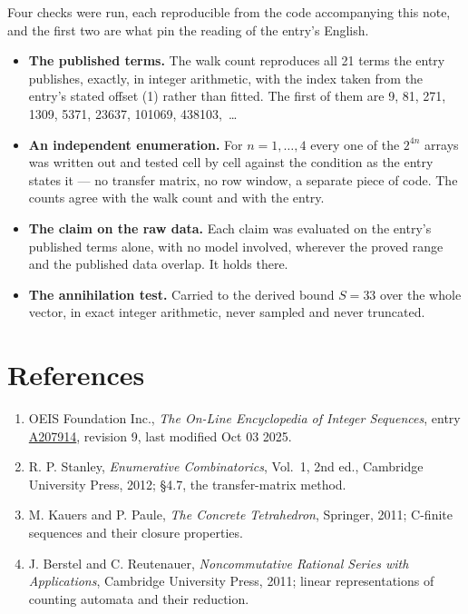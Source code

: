 \documentclass[11pt]{article}
\theoremstyle{definition}
\begin{document}
Four checks were run, each reproducible from the code accompanying this note, and the first two are what pin the reading of the entry's English.

\begin{itemize}

\item {\bfseries The published terms.} The walk count reproduces all 21 terms the entry publishes, exactly, in integer arithmetic, with the index taken from the entry's stated offset (1) rather than fitted. The first of them are 9, 81, 271, 1309, 5371, 23637, 101069, 438103,~\dots

\item {\bfseries An independent enumeration.} For $n = 1,\dots,4$ every one of the $2^{4n}$ arrays was written out and tested cell by cell against the condition as the entry states it --- no transfer matrix, no row window, a separate piece of code. The counts agree with the walk count and with the entry.

\item {\bfseries The claim on the raw data.} Each claim was evaluated on the entry's published terms alone, with no model involved, wherever the proved range and the published data overlap. It holds there.

\item {\bfseries The annihilation test.} Carried to the derived bound $S = 33$ over the whole vector, in exact integer arithmetic, never sampled and never truncated.

\end{itemize}

\section{References}

\begin{enumerate}

\item OEIS Foundation Inc., \emph{The On-Line Encyclopedia of Integer Sequences}, entry \href{https://oeis.org/A207914}{A207914}, revision 9, last modified Oct 03 2025.

\item R. P. Stanley, \emph{Enumerative Combinatorics}, Vol.~1, 2nd ed., Cambridge University Press, 2012; \S4.7, the transfer-matrix method.

\item M. Kauers and P. Paule, \emph{The Concrete Tetrahedron}, Springer, 2011; C-finite sequences and their closure properties.

\item J. Berstel and C. Reutenauer, \emph{Noncommutative Rational Series with Applications}, Cambridge University Press, 2011; linear representations of counting automata and their reduction.

\end{enumerate}
\end{document}
